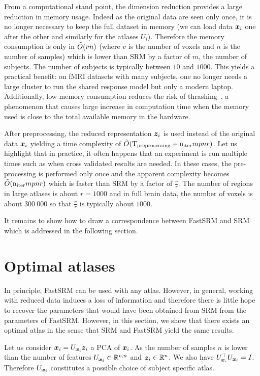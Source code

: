 From a computational stand point, the dimension reduction provides
a large reduction in memory usage. Indeed as the original data are seen only
once, it is no longer necessary to keep the full dataset in memory (we can load
data $\boldsymbol{x}_i$ one after the other and similarly for the atlases $U_i$). Therefore
the memory consumption is only in $\tilde{O}(vn)$ (where $v$ is the number of voxels
and $n$ is the number of samples) which is lower than SRM by a factor of $m$,
the number of subjects. The number of subjects is typically between $10$ and
$1000$. This yields a practical benefit: on fMRI datasets with many subjects, one no longer needs a large cluster to run the shared response model but only a modern laptop.
Additionally, low memory consumption reduces the
risk of thrashing~\cite{denning1968thrashing}, a phenomenon that causes large
increase in computation time when the memory used is close to the total available
memory in the hardware.

After preprocessing, the reduced representation $\boldsymbol{z}_i$ is used instead of the
original data $\boldsymbol{x}_i$ yielding a time complexity of $\tilde{O}(
\mathrm{T_{preprocessing}} + \mathrm{n_{iter}} mpnr)$.
Let us highlight that in practice, it often happens that an experiment is run
multiple times such as when cross validated results are needed. In these cases,
the pre-processing is performed only once and the apparent complexity becomes
$\tilde{O}(\mathrm{n_{iter}} mpnr)$ which is faster than SRM by
a factor of $\frac{v}{r}$. The number of regions in large atlases is about $r=1000$ and in full brain data, the number of voxels is about $300~000$ so that $\frac{v}{r}$ is typically about $1000$.

It remains to show how to draw a correspondence between FastSRM and SRM which is addressed in the following section.

\section{Optimal atlases}
In principle, FastSRM can be used with any atlas. 
However, in general, working with reduced data induces a loss of information and
therefore there is little hope to recover the parameters that would have been obtained from SRM from the parameters of FastSRM.
However, in this section, we show that there exists an optimal atlas in the sense that SRM and FastSRM yield the same results.

Let us consider $\boldsymbol{x}_i = U_{\boldsymbol{x}_i} \boldsymbol{z}_i$ a PCA of $\boldsymbol{x}_i$. As the number of
samples $n$ is lower than the number of features $U_{\boldsymbol{x}_i} \in \mathbb{R}^{v, n}$ and $\boldsymbol{z}_i \in \mathbb{R}^{n}$.  We also have $U_{\boldsymbol{x}_i}^{\top}U_{\boldsymbol{x}_i} = I$.
Therefore $U_{\boldsymbol{x}_i}$ constitutes a possible choice of subject specific atlas.

